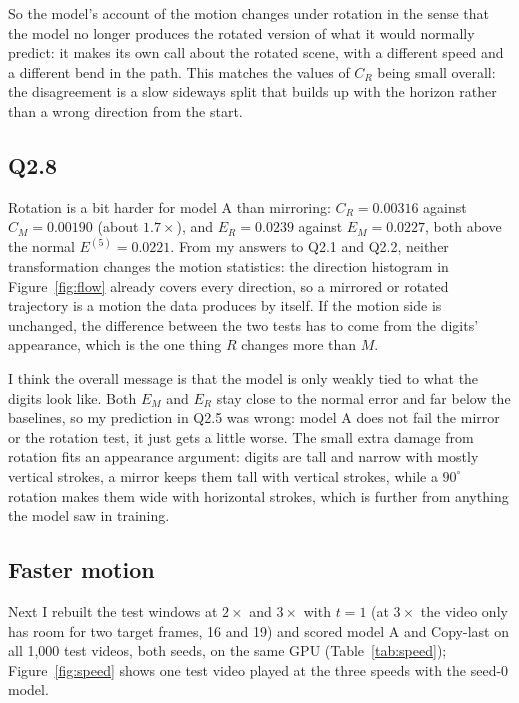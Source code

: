 \documentclass[11pt,letterpaper]{article}
\begin{document}
So the model's account of the motion changes under rotation in the sense that the model no longer
produces the rotated version of what it would normally predict: it makes its own call about the
rotated scene, with a different speed and a different bend in the path. This matches the values of
$C_R$ being small overall: the disagreement is a slow sideways split that builds up with the
horizon rather than a wrong direction from the start.

\subsection*{Q2.8}

Rotation is a bit harder for model A than mirroring: $C_R = 0.00316$ against $C_M = 0.00190$
(about $1.7\times$), and $E_R = 0.0239$ against $E_M = 0.0227$, both above the normal
$E^{(5)} = 0.0221$. From my answers to Q2.1 and Q2.2, neither transformation changes the motion
statistics: the direction histogram in Figure~\ref{fig:flow} already covers every direction, so a
mirrored or rotated trajectory is a motion the data produces by itself. If the motion side is unchanged, the
difference between the two tests has to come from the digits' appearance, which is the one thing
$R$ changes more than $M$.

I think the overall message is that the model is only weakly tied to what the digits look like.
Both $E_M$ and $E_R$ stay close to the normal error and far below the baselines, so my prediction
in Q2.5 was wrong: model A does not fail the mirror or the rotation test, it just gets a little
worse. The small extra damage from rotation fits an appearance argument: digits are tall and narrow with
mostly vertical strokes, a mirror keeps them tall with vertical strokes, while a $90^\circ$ rotation
makes them wide with horizontal strokes, which is further from anything the model saw in training.

\subsection*{Faster motion}

Next I rebuilt the test windows at $2\times$ and $3\times$ with $t=1$ (at $3\times$ the video only
has room for two target frames, 16 and 19) and scored model A and Copy-last on all 1,000 test
videos, both seeds, on the same GPU (Table~\ref{tab:speed}); Figure~\ref{fig:speed} shows one test
video played at the three speeds with the seed-0 model.
\end{document}
